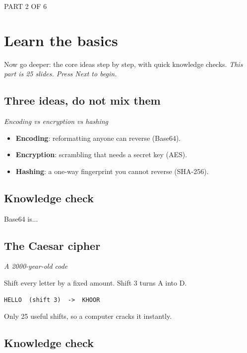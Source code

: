 \documentclass[12pt,openany]{book}
\begin{document}
\medskip

\vspace{4pt}\noindent\textsc{PART 2 OF 6}


\section*{Learn the basics}

Now go deeper: the core ideas step by step, with quick knowledge checks.
{\small\itshape\color{gray}This part is 25 slides. Press Next to begin.}

\medskip

\subsection*{Three ideas, do not mix them}
{\small\itshape\color{gray}Encoding vs encryption vs hashing}


\begin{itemize}
  \item \textbf{Encoding}: reformatting anyone can reverse (Base64).
  \item \textbf{Encryption}: scrambling that needs a secret key (AES).
  \item \textbf{Hashing}: a one-way fingerprint you cannot reverse (SHA-256).
\end{itemize}

\medskip

\subsection*{Knowledge check}

Base64 is...

\medskip

\subsection*{The Caesar cipher}
{\small\itshape\color{gray}A 2000-year-old code}


Shift every letter by a fixed amount. Shift 3 turns A into D.

\begin{lstlisting}
HELLO  (shift 3)  ->  KHOOR\end{lstlisting}

Only 25 useful shifts, so a computer cracks it instantly.

\medskip

\subsection*{Knowledge check}
\end{document}
